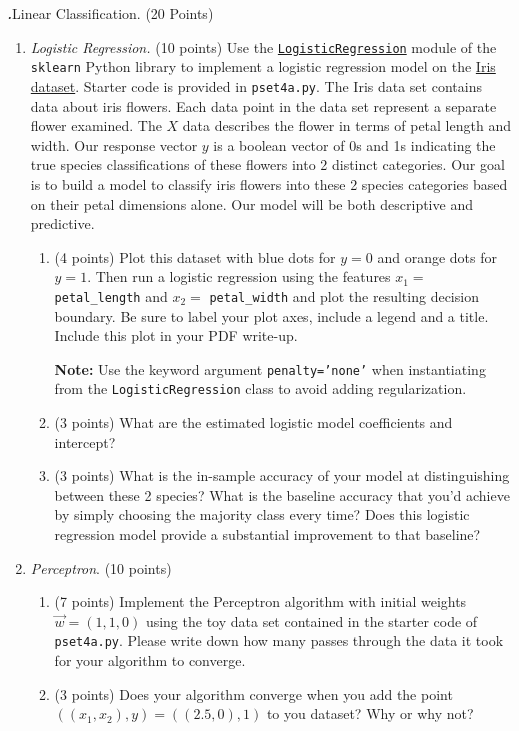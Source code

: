 \documentclass[12pt]{amsart}
\newenvironment{statement}[1]{\smallskip\noindent\color[rgb]{0.0,0.0,0.0} {\bf #1.}}{}
\newcommand{\1}{\mathds{1}}
\begin{document}
\newpage
\begin{statement}{4}
\textit{Linear Classification.} (20 Points) 
\begin{enumerate}
    \item \emph{Logistic Regression.} (10 points) Use the \texttt{\href{https://scikit-learn.org/stable/modules/generated/sklearn.linear_model.LogisticRegression.html}{LogisticRegression}} module of the \texttt{sklearn} Python library to implement a logistic regression model on the \href{https://scikit-learn.org/stable/auto_examples/datasets/plot_iris_dataset.html}{Iris dataset}. Starter code is provided in \texttt{pset4a.py}. The Iris data set contains data about iris flowers. Each data point in the data set represent a separate flower examined. The $X$ data describes the flower in terms of petal length and width. Our response vector $y$ is a boolean vector of 0s and 1s indicating the true species classifications of these flowers into 2 distinct categories. Our goal is to build a model to classify iris flowers into these 2 species categories based on their petal dimensions alone. Our model will be both descriptive and predictive. 

    \begin{enumerate}
        \item (4 points) Plot this dataset with blue dots for $y = 0$ and orange dots for $y = 1$. Then run a logistic regression using the features $x_1 =$ \texttt{petal\_length} and $x_2 =$ \texttt{petal\_width} and plot the resulting decision boundary. Be sure to label your plot axes, include a legend and a title. Include this plot in your PDF write-up.
        
        \noindent \textbf{Note:} Use the keyword argument \texttt{penalty='none'} when instantiating from the \texttt{LogisticRegression} class to avoid adding regularization.
        
        \item (3 points) What are the estimated logistic model coefficients and intercept?
        \item (3 points) What is the in-sample accuracy of your model at distinguishing between these 2 species? What is the baseline accuracy that you'd achieve by simply choosing the majority class every time? Does this logistic regression model provide a substantial improvement to that baseline?

        
    \end{enumerate}
    
    \item \emph{Perceptron}. (10 points)
    \begin{enumerate}
        \item (7 points) Implement the Perceptron algorithm with initial weights $\vec w = (1, 1, 0)$ using the toy data set contained in the starter code of \texttt{pset4a.py}. Please write down how many passes through the data it took for your algorithm to converge.
        \item (3 points) Does your algorithm converge when you add the point $((x_1, x_2), y) = ((2.5, 0), 1)$ to you dataset? Why or why not? 
        

\end{enumerate}
\end{enumerate}
\end{statement}
\end{document}
